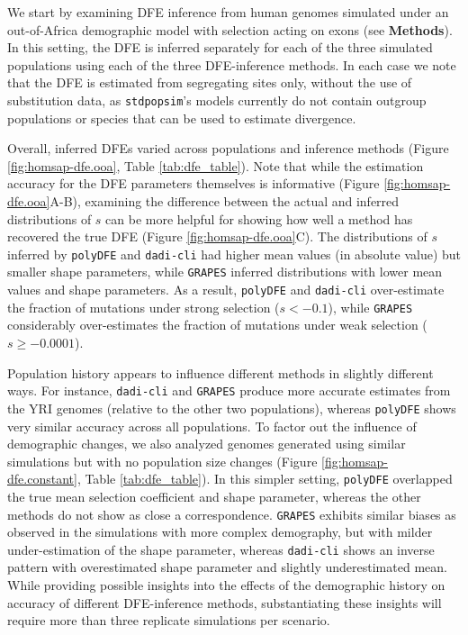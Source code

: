 \documentclass[hidelinks]{article}
\newcommand{\stdpopsim}{\texttt{stdpopsim}\xspace}
\newcommand{\polydfe}{\texttt{polyDFE}\xspace}
\newcommand{\dadicli}{\texttt{dadi-cli}\xspace}
\newcommand{\grapes}{\texttt{GRAPES}\xspace}
\begin{document}
    We start by examining DFE inference from human genomes simulated under an out-of-Africa demographic model
    with selection acting on exons (see \textbf{Methods}).
    In this setting, the DFE is inferred separately for each of the three simulated populations
    using each of the three DFE-inference methods.
    In each case we note that the DFE is estimated from segregating sites only,
    without the use of substitution data, as \stdpopsim's models currently do not
    contain outgroup populations or species that can be used to estimate divergence.

    Overall, inferred DFEs varied across populations and inference methods (Figure \ref{fig:homsap-dfe.ooa}, Table \ref{tab:dfe_table}).
    Note that while the estimation accuracy for the DFE parameters themselves is informative (Figure \ref{fig:homsap-dfe.ooa}A-B),
    examining the difference between the actual and inferred distributions of $s$ can be more helpful for showing how well a method
    has recovered the true DFE (Figure \ref{fig:homsap-dfe.ooa}C). 
    The distributions of $s$ inferred by \polydfe and \dadicli had higher mean values (in absolute value)
    but smaller shape parameters, while \grapes inferred distributions with lower mean values and shape parameters.
    As a result, \polydfe and \dadicli over-estimate the fraction of mutations under strong selection ($s<-0.1$),
    while \grapes considerably over-estimates the fraction of mutations under weak selection ($s\geq-0.0001$). 

    Population history appears to influence different methods in slightly different ways.
    For instance, \dadicli and \grapes produce more accurate estimates from the YRI genomes
    (relative to the other two populations), whereas \polydfe
    shows very similar accuracy across all populations.
    To factor out the influence of demographic changes, we also analyzed genomes generated using similar
    simulations but with no population size changes (Figure \ref{fig:homsap-dfe.constant}, Table \ref{tab:dfe_table}).
    In this simpler setting, \polydfe overlapped the true mean selection coefficient and shape parameter, whereas
    the other methods do not show as close a correspondence.
    \grapes exhibits similar biases as observed in the simulations with more complex demography,
    but with milder under-estimation of the shape parameter,
    whereas \dadicli shows an inverse pattern
    with overestimated shape parameter and slightly underestimated mean.
    While providing possible insights into the effects of the demographic history
    on accuracy of different DFE-inference methods, substantiating these insights
    will require more than three replicate simulations per scenario.
\end{document}
